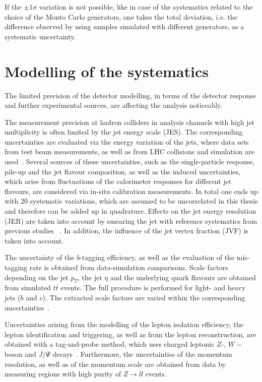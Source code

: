  If the $\pm 1 \sigma$ variation is not possible, like in case of the systematics related to the choice of the Monto Carlo generators, one takes the total deviation, i.e. the difference observed by using samples simulated with different generators, as a systematic uncertainty. 


	

\section{Modelling of the systematics}
The limited precision of the detector modelling, in terms of the detector response and further experimental sources, are affecting the analysis noticeably. 

 The measurement precision at hadron colliders in analysis channels with high jet multiplicity is often limited by the jet energy scale (JES). The corresponding uncertainties are evaluated via the energy variation of the jets, where
data sets from test beam measurements, as well as from LHC collisions and simulation are used~\cite{Aad:2011he, Aad:2012ag, Aad:2012vm,Aad:2014bia}. Several sources of these uncertainties, such as the single-particle response, pile-up and the jet flavour composition, as well as the induced uncertainties, which arise from fluctuations of the calorimeter responses for different jet flavours, 
 are considered via in-situ calibration measurements.  In total one ends up with 20 systematic variations, which are assumed to be uncorrelated in this thesis and therefore can be added up in quadrature. 
 Effects on the jet energy resolution (JER) are taken into account by smearing the jet with reference systematics from previous studies ~\cite{ATL-PHYS-PUB-2015-015}.
 In addition, the influence of the  jet vertex fraction (JVF)  is taken into account.
 

 The uncertainty of the $b$-tagging efficiency, as well as the evaluation of the mis-tagging rate is obtained from data-simulation comparisons. Scale factors depending on the jet $p_T$, the jet $\eta$ and the underlying quark flavours are obtained from simulated $t\bar{t}$ events.  
The full procedure is performed  for  light- and heavy jets ($b$ and $c$). The extracted scale factors are varied within the corresponding uncertainties~\cite{ATLAS-CONF-2014-046, ATLAS-CONF-2014-004, ATL-PHYS-PUB-2015-022}.


 Uncertainties arising from the modelling of the lepton isolation efficiency, the lepton identification and triggering, as well as from the lepton reconstruction, are obtained with a tag-and-probe method, which uses charged leptonic  $Z$-, $W-$boson and $J/\Psi$ decays~\cite{ATLAS:2016iqc,ATL-PHYS-PUB-2016-015,Aad:2011mk,Aad:2016jkr}. Furthermore, the uncertainties of the  momentum resolution,  as well as of the momentum scale  are  obtained from data by measuring regions with high purity of  $Z \rightarrow ll$ events.

